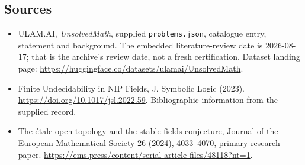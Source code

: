 \documentclass[11pt,a4paper]{article}
\begin{document}
\subsection{Sources}

{\small

\begin{itemize}

\item[\hypertarget{source:statement:1}{S1}] ULAM.AI, \emph{UnsolvedMath}, supplied \texttt{problems.json}, catalogue entry, statement and background. The embedded literature-review date is 2026-08-17; that is the archive’s review date, not a fresh certification. Dataset landing page: \url{https://huggingface.co/datasets/ulamai/UnsolvedMath}.

\item[\hypertarget{source:statement:2}{S2}] Finite Undecidability in NIP Fields, J. Symbolic Logic (2023). \url{https://doi.org/10.1017/jsl.2022.59}. Bibliographic information from the supplied record.

\item[R1] The étale-open topology and the stable fields conjecture, Journal of the European Mathematical Society 26 (2024), 4033--4070, primary research paper.
\url{https://ems.press/content/serial-article-files/48118?nt=1}.
\end{itemize}

}

\label{end:statement}
\end{document}
